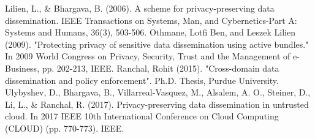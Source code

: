 \documentclass[conference]{IEEEtran}
\begin{document}
\begin{thebibliography}{00}
 Lilien, L., \& Bhargava, B. (2006). A scheme for privacy-preserving data dissemination. IEEE Transactions on Systems, Man, and Cybernetics-Part A: Systems and Humans, 36(3), 503-506.
 Othmane, Lotfi Ben, and Leszek Lilien (2009). "Protecting privacy of sensitive data dissemination using active bundles." In 2009 World Congress on Privacy, Security, Trust and the Management of e-Business, pp. 202-213, IEEE.
 Ranchal, Rohit (2015). "Cross-domain data dissemination and policy enforcement". Ph.D. Thesis, Purdue University.
 Ulybyshev, D., Bhargava, B., Villarreal-Vasquez, M., Alsalem, A. O., Steiner, D., Li, L., \& Ranchal, R. (2017). Privacy-preserving data dissemination in untrusted cloud. In 2017 IEEE 10th International Conference on Cloud Computing (CLOUD) (pp. 770-773). IEEE.

\end{thebibliography}
\vspace{12pt}
\end{document}
